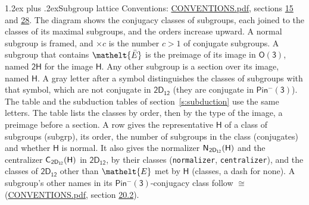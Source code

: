 \documentclass[10pt,a4paper]{article}
\makeatletter
\renewcommand\section{\@startsection{section}{1}{\z@}{-3ex plus -1ex minus -.2ex}%
  {1.2ex plus .2ex}{\normalfont\large\sffamily\bfseries\color{parttitle}}}
\numberwithin{equation}{section}
\newcommand{\eltfont}[1]{{\let\sigma\eltsigma\mathelt{#1}}}
\newcommand{\grp}[1]{\mathsf{#1}}
\newcommand{\cls}[1]{\eltfont{#1}}
\newcommand{\elt}[1]{\eltfont{#1}}
\newcommand{\samecls}{\cong}
\newcommand{\barred}[1]{\bar{#1}}
\newcommand{\hairsp}{\mkern1mu}
\makeatother
\begin{document}
\section{Subgroup lattice}\label{s:subgroups}
Conventions: \href{../../CONVENTIONS.pdf}{CONVENTIONS.pdf}, sections \href{../../../rotation/CONVENTIONS.pdf\#conv.15}{15} and \href{../../CONVENTIONS.pdf\#conv.28}{28}.
The diagram shows the conjugacy classes of subgroups, each joined to the classes of its maximal subgroups, and the orders increase upward. A normal subgroup is framed, and ${\times}c$ is the number $c > 1$ of conjugate subgroups. \label{n:group.H}A subgroup that contains $\elt{\barred{E}}$ is the preimage of its image in $\grp{O(3)}$, named $\grp{2H}$ for the image $\grp{H}$. Any other subgroup is a section over its image, named $\grp{H}$. \label{n:mark.letter}A gray letter after a symbol distinguishes the classes of subgroups with that symbol, which are not conjugate in $\grp{2D_{12}}$ (they are conjugate in \href{Pinminus3.pdf}{$\grp{Pin^{-}(3)}$}). The table and the subduction tables of section~\ref{s:subduction} use the same letters. The table lists the classes by order, then by the type of the image, a preimage before a section. \label{n:head.subgroup}\label{n:head.order}\label{n:head.conjugates}\label{n:head.normal}A row gives the representative $\grp{H}$ of a class of subgroups (subgrp), its order, the number of subgroups in the class (conjugates) and whether $\grp{H}$ is normal. \label{n:group.normalizer}\label{n:group.centralizer}\label{n:head.classes}It also gives the normalizer $\grp{N}_{\hairsp \grp{2D_{12}}}(\grp{H})$ and the centralizer $\grp{C}_{\hairsp \grp{2D_{12}}}(\grp{H})$ in $\grp{2D_{12}}$, by their classes (\texttt{normalizer}, \texttt{centralizer}), and the classes of $\grp{2D_{12}}$ other than $\cls{E}$ met by $\grp{H}$ (classes, a dash for none). A subgroup's other names in its \href{Pinminus3.pdf}{$\grp{Pin^{-}(3)}$}-conjugacy class follow $\samecls$ (\href{../../CONVENTIONS.pdf}{CONVENTIONS.pdf}, section \href{../../CONVENTIONS.pdf\#conv.20.2}{20.2}).
\end{document}
